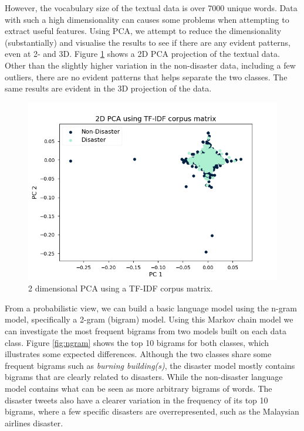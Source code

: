 \documentclass[journal, ]{IEEEtran}
\let\MYoriglatexcaption\caption
\renewcommand{\caption}[2][\relax]{\MYoriglatexcaption[#2]{#2}}
\begin{document}
However, the vocabulary size of the textual data is over 7000 unique words.
Data with such a high dimensionality can causes some problems when attempting
to extract useful features. Using PCA, we attempt to reduce the dimensionality
(substantially) and visualise the results to see if there are any evident
patterns, even at 2- and 3D. Figure \ref{fig:pca} shows a 2D PCA projection
of the textual data. Other than the slightly higher variation in the
non-disaster data, including a few outliers, there are no evident patterns that
helps separate the two classes. The same results are evident in the 3D
projection of the data. 

\begin{figure}[hbt!]
  \centering
  \includegraphics[width=\linewidth]{../figures/pca.png}
  \caption{2 dimensional PCA using a TF-IDF corpus matrix.}
  \label{fig:pca}
\end{figure}

From a probabilistic view, we can build a basic language model using the n-gram
model, specifically a 2-gram (bigram) model. Using this Markov chain model we
can investigate the most frequent bigrams from two models built on each data
class. Figure \ref{fig:ngram} shows the top 10 bigrams for both classes, which
illustrates some expected differences. Although the two classes share some
frequent bigrams such as \textit{burning building(s)}, the disaster model
mostly contains bigrams that are clearly related to disasters. While the
non-disaster language model contains what can be seen as more arbitrary bigrams
of words. The disaster tweets also have a clearer variation in the frequency of
its top 10 bigrams, where a few specific disasters are overrepresented, such as
the Malaysian airlines disaster.
\end{document}

